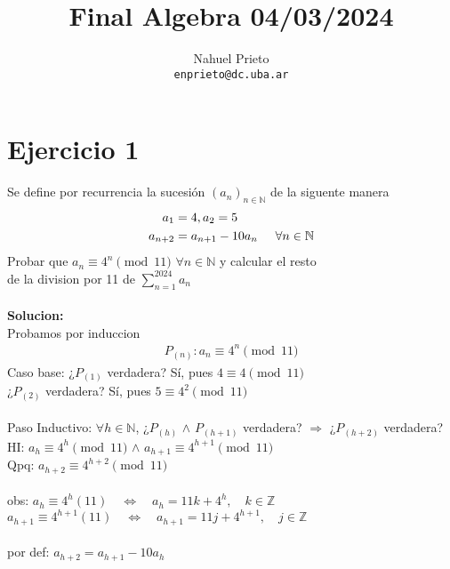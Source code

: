 \documentclass[12pt,a4paper]{article}
\title{Final Algebra 04/03/2024}
\author{Nahuel Prieto \\ \texttt{enprieto@dc.uba.ar}}
\date{}
\begin{document}
\maketitle

\section{Ejercicio 1}
    Se define por recurrencia la sucesión $(a_{n})_{n \in \mathbb{N}}$ de la siguente manera 
\begin{align*}
    a_1 &= 4,  a_2 = 5 \\ a_{n+2} &= a_{n+1} - 10a_n \hspace{0.5cm} \forall n \in \mathbb{N}
\end{align*}
Probar que $a_n\equiv 4^n \pmod{11}$ $\forall n \in \mathbb{N}$ y calcular el resto \\
de la division por 11 de $\sum_{n=1}^{2024} a_n$\\ \\
\textbf{Solucion:} \\
Probamos por induccion
\begin{align*}   
    P_{(n)}: a_n \equiv 4^n \pmod{11}
\end{align*}
Caso base: ¿$P_{(1)}$ verdadera? Sí, pues $4 \equiv 4 \pmod{11}$\\
\hspace*{50px}¿$P_{(2)}$ verdadera? Sí, pues $5 \equiv 4^2 \pmod{11}$ \\ \\
Paso Inductivo: $\forall h \in \mathbb{N}$, ¿$P_{(h)}$ $\land$ $P_{(h+1)}$ verdadera? $\Rightarrow$ ¿$P_{(h+2)}$ verdadera? \\ 
HI: $a_h \equiv 4^h \pmod{11}$ $\land$ $a_{h+1} \equiv 4^{h+1} \pmod{11}$ \\
Qpq: $a_{h+2} \equiv 4^{h+2} \pmod{11}$ \\ \\
obs: $a_h \equiv 4^h (11) \quad \Longleftrightarrow \quad a_h = 11k +4^h, \quad k \in \mathbb{Z}$  \\
\hspace*{0.4cm}$a_{h+1} \equiv 4^{h+1} (11) \quad \Longleftrightarrow \quad a_{h+1} = 11j +4^{h+1}, \quad j \in \mathbb{Z}$ \\ \\
por def: $a_{h+2} = a_{h+1} - 10a_h$     
\end{document}
